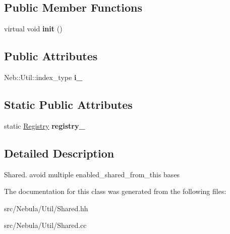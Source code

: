 \subsection*{\-Public \-Member \-Functions}
\begin{DoxyCompactItemize}
\item 
\hypertarget{classNeb_1_1Util_1_1Shared_a07e6ce5042334f53081f5d04d5b0bb0f}{virtual void {\bfseries init} ()}\label{classNeb_1_1Util_1_1Shared_a07e6ce5042334f53081f5d04d5b0bb0f}

\end{DoxyCompactItemize}
\subsection*{\-Public \-Attributes}
\begin{DoxyCompactItemize}
\item 
\hypertarget{classNeb_1_1Util_1_1Shared_a13ef0910eea12cb1d97bc6b36582dcea}{\-Neb\-::\-Util\-::index\-\_\-type {\bfseries i\-\_\-}}\label{classNeb_1_1Util_1_1Shared_a13ef0910eea12cb1d97bc6b36582dcea}

\end{DoxyCompactItemize}
\subsection*{\-Static \-Public \-Attributes}
\begin{DoxyCompactItemize}
\item 
\hypertarget{classNeb_1_1Util_1_1Shared_a7cefd1bc3b7b07a8d9c4cecbb7f7fd99}{static \hyperlink{classNeb_1_1Util_1_1Registry}{\-Registry} {\bfseries registry\-\_\-}}\label{classNeb_1_1Util_1_1Shared_a7cefd1bc3b7b07a8d9c4cecbb7f7fd99}

\end{DoxyCompactItemize}


\subsection{\-Detailed \-Description}
\-Shared. avoid multiple enabled\-\_\-shared\-\_\-from\-\_\-this bases 

\-The documentation for this class was generated from the following files\-:\begin{DoxyCompactItemize}
\item 
src/\-Nebula/\-Util/\-Shared.\-hh\item 
src/\-Nebula/\-Util/\-Shared.\-cc\end{DoxyCompactItemize}
